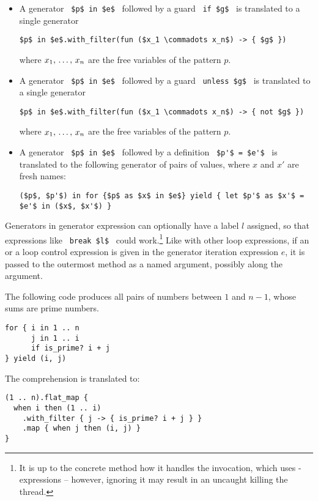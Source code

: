 \begin{itemize}
\item A generator ~\lstinline!$p$ in $e$!~ followed by a guard ~\lstinline!if $g$!~ is translated to a single generator
\begin{lstlisting}
$p$ in $e$.with_filter(fun ($x_1 \commadots x_n$) -> { $g$ })
\end{lstlisting}
where $x_1 ,\, \ldots ,\, x_n$ are the free variables of the pattern $p$. 

\item A generator ~\lstinline!$p$ in $e$!~ followed by a guard ~\lstinline!unless $g$!~ is translated to a single generator
\begin{lstlisting}
$p$ in $e$.with_filter(fun ($x_1 \commadots x_n$) -> { not $g$ })
\end{lstlisting}
where $x_1 ,\, \ldots ,\, x_n$ are the free variables of the pattern $p$. 

\item A generator ~\lstinline!$p$ in $e$!~ followed by a definition ~\lstinline!$p'$ = $e'$!~ is translated to the following generator of pairs of values, where $x$ and $x'$ are fresh names:
\begin{lstlisting}
($p$, $p'$) in for {$p$ as $x$ in $e$} yield { let $p'$ as $x'$ = $e'$ in ($x$, $x'$) }
\end{lstlisting}

\end{itemize}

Generators in generator expression can optionally have a label $l$ assigned, so that expressions like ~\lstinline!break $l$!~ could work.\footnote{It is up to the concrete method how it handles the invocation, which uses - expressions -- however, ignoring it may result in an uncaught  killing the thread.} Like with other loop expressions, if an  or a  loop control expression is given in the generator iteration expression $e$, it is passed to the outermost  method as a named argument, possibly along the  argument. 

\example The following code produces all pairs of numbers between $1$ and $n - 1$, whose sums are prime numbers. 
\begin{lstlisting}
for { i in 1 .. n
      j in 1 .. i
      if is_prime? i + j
} yield (i, j)
\end{lstlisting}
The comprehension is translated to:
\begin{lstlisting}
(1 .. n).flat_map {
  when i then (1 .. i)
    .with_filter { j -> { is_prime? i + j } }
    .map { when j then (i, j) }
}
\end{lstlisting}

